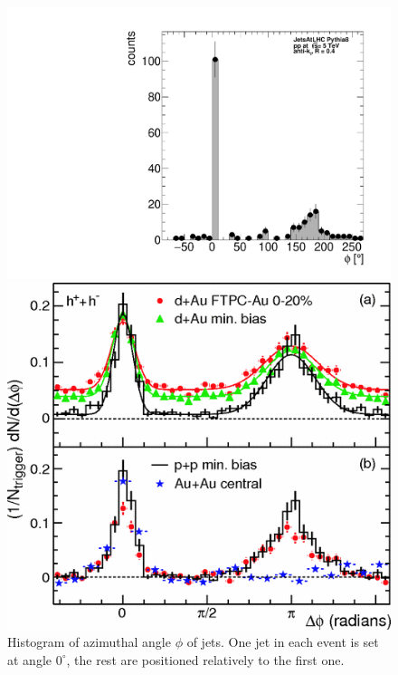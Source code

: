 \documentclass[a4paper,10pt]{article}
\begin{document}
\begin{figure}[htbp]
    \centering
    \begin{minipage}{0.33\textwidth}
        \centering
        \includegraphics[width=\textwidth]{figures/hDijetPhi2.pdf}
        \caption{Histogram of azimuthal angle $\phi$ of jets. One jet in each event is set at angle $0^{\circ}$, the rest are positioned relatively to the first one. }
        \label{f7}
    \end{minipage}\hfill
    \begin{minipage}{0.33\textwidth}
    \centering
    \includegraphics[width=\textwidth]{figures/jetsAtRHIC.png}

\end{minipage}
\end{figure}
\end{document}
